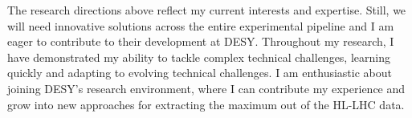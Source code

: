\documentclass[11pt, a4paper]{awesome-cv}
\begin{document}
\begin{cvletter}
  The research directions above reflect my current interests and expertise. Still, we will need innovative solutions across the entire experimental pipeline and I am eager to contribute to their development at DESY. Throughout my research, I have demonstrated my ability to tackle complex technical challenges, learning quickly and adapting to evolving technical challenges. I am enthusiastic about joining DESY's research environment, where I can contribute my experience and grow into new approaches for extracting the maximum out of the HL-LHC data.

\end{cvletter}

\makeletterclosing
\end{document}
